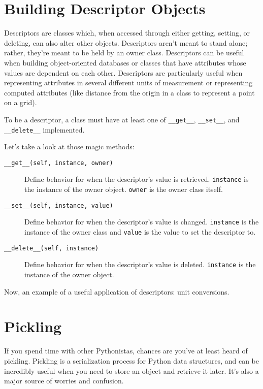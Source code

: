 \documentclass[a4paper,11pt]{article}
\newcommand{\code}[1]{\texttt{#1}}
\begin{document}
\section{Building Descriptor Objects}

Descriptors are classes which, when accessed through either getting, setting, or deleting, can also alter other objects. Descriptors aren't meant to stand alone; rather, they're meant to be held by an owner class. Descriptors can be useful when building object-oriented databases or classes that have attributes whose values are dependent on each other. Descriptors are particularly useful when representing attributes in several different units of measurement or representing computed attributes (like distance from the origin in a class to represent a point on a grid).

To be a descriptor, a class must have at least one of \code{__get__}, \code{__set__}, and \code{__delete__} implemented. 

Let's take a look at those magic methods:

\begin{description}

\item[\code{__get__(self, instance, owner)}]
Define behavior for when the descriptor's value is retrieved. \code{instance} is the instance of the owner object. \code{owner} is the owner class itself.

\item[\code{__set__(self, instance, value)}]
Define behavior for when the descriptor's value is changed. \code{instance} is the instance of the owner class and \code{value} is the value to set the descriptor to.

\item[\code{__delete__(self, instance)}]
Define behavior for when the descriptor's value is deleted. \code{instance} is the instance of the owner object.

\end{description}

\noindent
Now, an example of a useful application of descriptors: unit conversions.



\section{Pickling}

If you spend time with other Pythonistas, chances are you've at least heard of pickling. Pickling is a serialization process for Python data structures, and can be incredibly useful when you need to store an object and retrieve it later. It's also a major source of worries and confusion.
\end{document}
